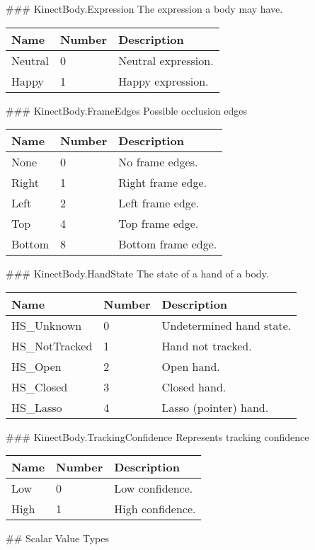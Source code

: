  \#\#\# KinectBody.Expression The expression a body may have.

\begin{longtable}[c]{@{}lll@{}}
\toprule
Name & Number & Description\tabularnewline
\midrule
\endhead
Neutral & 0 & Neutral expression.\tabularnewline
Happy & 1 & Happy expression.\tabularnewline
\bottomrule
\end{longtable}

 \#\#\# KinectBody.FrameEdges Possible occlusion edges

\begin{longtable}[c]{@{}lll@{}}
\toprule
Name & Number & Description\tabularnewline
\midrule
\endhead
None & 0 & No frame edges.\tabularnewline
Right & 1 & Right frame edge.\tabularnewline
Left & 2 & Left frame edge.\tabularnewline
Top & 4 & Top frame edge.\tabularnewline
Bottom & 8 & Bottom frame edge.\tabularnewline
\bottomrule
\end{longtable}

 \#\#\# KinectBody.HandState The state of a hand of a body.

\begin{longtable}[c]{@{}lll@{}}
\toprule
Name & Number & Description\tabularnewline
\midrule
\endhead
HS\_Unknown & 0 & Undetermined hand state.\tabularnewline
HS\_NotTracked & 1 & Hand not tracked.\tabularnewline
HS\_Open & 2 & Open hand.\tabularnewline
HS\_Closed & 3 & Closed hand.\tabularnewline
HS\_Lasso & 4 & Lasso (pointer) hand.\tabularnewline
\bottomrule
\end{longtable}

 \#\#\# KinectBody.TrackingConfidence Represents tracking confidence

\begin{longtable}[c]{@{}lll@{}}
\toprule
Name & Number & Description\tabularnewline
\midrule
\endhead
Low & 0 & Low confidence.\tabularnewline
High & 1 & High confidence.\tabularnewline
\bottomrule
\end{longtable}

 \#\# Scalar Value Types

